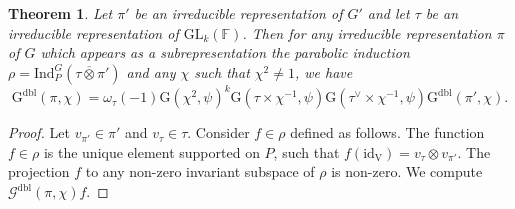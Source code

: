\documentclass[12pt, reqno]{amsart}
\newtheorem{theorem}{Theorem}[section]
\theoremstyle{definition}
\theoremstyle{definition}
\theoremstyle{definition}
\newcommand{\idmap}{\mathrm{id}}
\newcommand{\hermitianSpace}{\mathrm{V}}
\newcommand{\fieldCharacter}{\psi}
\newcommand{\centralCharacter}[1]{\omega_{#1}}
\newcommand{\Ind}[3]{\mathrm{Ind}_{#1}^{#2}\left(#3\right)}
\newcommand{\Contragradient}[1]{#1^{\vee}}
\newcommand{\GL}{\mathrm{GL}}
\newcommand{\finiteField}{\mathbb{F}}
\newcommand{\dblGaussSum}[2]{\mathcal{G}^{\mathrm{dbl}}\left(#1, #2\right)}
\newcommand{\GaussSumScalar}[2]{\mathrm{G}\left(#1, #2\right)}
\newcommand{\dblGaussSumScalar}[2]{\mathrm{G}^{\mathrm{dbl}}\left(#1, #2\right)}
\begin{document}
\begin{theorem}\label{thm:multiplicativity-in-terms-of-gauss-sums}
	Let $\pi'$ be an irreducible representation of $G'$ and let $\tau$ be an irreducible representation of $\GL_k\left(\finiteField\right)$. Then for any irreducible representation $\pi$ of $G$ which appears as a subrepresentation the parabolic induction $\rho = \Ind{P}{G}{\tau \overline{\otimes} \pi'}$ and any $\chi$ such that $\chi^2 \ne 1$, we have
	$$\dblGaussSumScalar{\pi}{\chi} = \centralCharacter{\tau}\left(-1\right) \GaussSumScalar{\chi^2}{\fieldCharacter}^k \GaussSumScalar{\tau \times \chi^{-1}}{\fieldCharacter} \GaussSumScalar{\Contragradient{\tau} \times \chi^{-1}}{\fieldCharacter} \dblGaussSumScalar{\pi'}{\chi}.$$
\end{theorem}
\begin{proof}
	Let $v_{\pi'} \in \pi'$ and $v_{\tau} \in \tau$. Consider $f \in \rho$ defined as follows. The function $f \in \rho$ is the unique element supported on $P$, such that $f\left(\idmap_{\hermitianSpace}\right) = v_{\tau} \otimes v_{\pi'}$. The projection $f$ to any non-zero invariant subspace of $\rho$ is non-zero. We compute $\dblGaussSum{\pi}{\chi} f$.
	

\end{proof}
\end{document}
